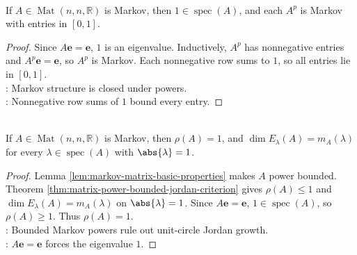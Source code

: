 \begin{lemma} \label{lem:markov-matrix-basic-properties} \\
If $A\in\operatorname{Mat}(n,n,\mathbb{R})$ is Markov, then $1\in\operatorname{spec}(A)$, and each $A^p$ is Markov with entries in $[0,1]$.
\begin{proof}
Since $A\mathbf{e}=\mathbf{e}$, $1$ is an eigenvalue. Inductively, $A^p$ has nonnegative entries and $A^p\mathbf{e}=\mathbf{e}$, so $A^p$ is Markov. Each nonnegative row sums to $1$, so all entries lie in $[0,1]$.\\
: Markov structure is closed under powers.\\
: Nonnegative row sums of $1$ bound every entry.
\end{proof}
\end{lemma}

\begin{theorem} \label{thm:markov-matrix-unit-circle-semisimple} \\
If $A\in\operatorname{Mat}(n,n,\mathbb{R})$ is Markov, then $\rho(A)=1$, and $\dim E_{\lambda}(A)=m_A(\lambda)$ for every $\lambda\in\operatorname{spec}(A)$ with $\abs{\lambda}=1$.
\begin{proof}
Lemma \ref{lem:markov-matrix-basic-properties} makes $A$ power bounded. Theorem \ref{thm:matrix-power-bounded-jordan-criterion} gives $\rho(A)\leq1$ and $\dim E_{\lambda}(A)=m_A(\lambda)$ on $\abs{\lambda}=1$. Since $A\mathbf{e}=\mathbf{e}$, $1\in\operatorname{spec}(A)$, so $\rho(A)\geq1$. Thus $\rho(A)=1$.\\
: Bounded Markov powers rule out unit-circle Jordan growth.\\
: $A\mathbf{e}=\mathbf{e}$ forces the eigenvalue $1$.
\end{proof}
\end{theorem}

